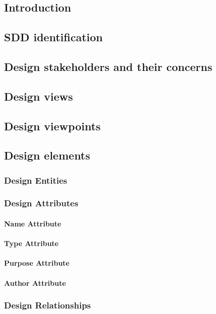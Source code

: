 \documentclass[letterpaper,10pt,titlepage,draftclsnofoot,onecolumn,onesided] {IEEEtran}
\begin{document}
\subsection{Introduction}

\subsection{SDD identification}

\subsection{Design stakeholders and their concerns}

\subsection{Design views}

\subsection{Design viewpoints}

\subsection{Design elements}
\subsubsection{Design Entities}
\subsubsection{Design Attributes}
\paragraph{Name Attribute}
\paragraph{Type Attribute}
\paragraph{Purpose Attribute}
\paragraph{Author Attribute}
\subsubsection{Design Relationships}
\end{document}
